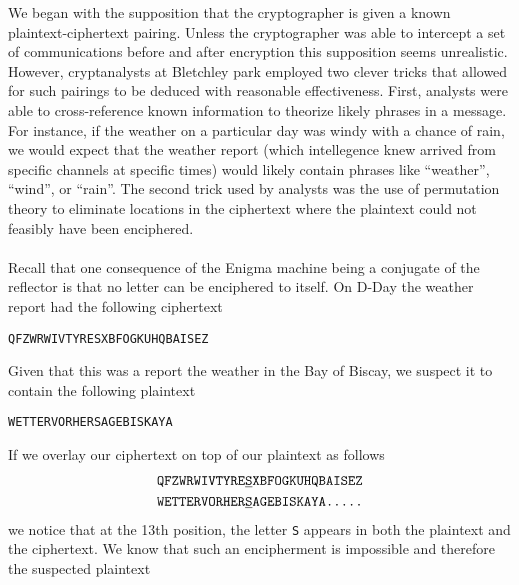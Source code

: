 We began with the supposition that the
cryptographer is given a known plaintext-ciphertext pairing. Unless
the cryptographer was able to intercept
a set of communications before and after encryption this supposition
seems unrealistic. However, cryptanalysts at Bletchley park
employed two clever tricks that allowed for such pairings to be
deduced with reasonable effectiveness. First, analysts were able to
cross-reference known information to theorize likely phrases in a
message. For instance, if the weather on a particular day was windy
with a chance of rain, we would expect that the weather report (which
intellegence knew arrived from specific channels at specific times)
would likely contain phrases like ``weather'', ``wind'', or ``rain''.
The second trick used by analysts was the use of permutation theory to
eliminate locations in the ciphertext where the plaintext could not
feasibly have been enciphered.
\\\\Recall that one consequence of the Enigma machine being a
conjugate of the reflector is that no letter can be enciphered to
itself. On D-Day the weather report had the following ciphertext
\begin{center}
	\texttt{QFZWRWIVTYRESXBFOGKUHQBAISEZ}
\end{center}
Given that this was a report the weather in the Bay of Biscay, we
suspect it to contain the following plaintext
\begin{center}
	\texttt{WETTERVORHERSAGEBISKAYA}
\end{center}
If we overlay our ciphertext on top of our plaintext as follows
\begin{align*}
	 & \texttt{QFZWRWIVTYRE}{\uline{\texttt{S}}}\texttt{XBFOGKUHQBAISEZ} \\
	 & \texttt{WETTERVORHER}{\uline{\texttt{S}}}\texttt{AGEBISKAYA.....}
\end{align*}
we notice that at the 13th position, the letter \texttt{S} appears in
both the plaintext and the ciphertext. We know that such an
encipherment is impossible and therefore the suspected plaintext
